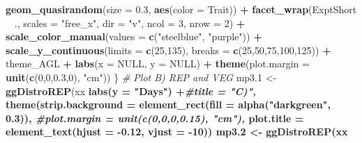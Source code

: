 \documentclass[
]{article}
\newenvironment{Shaded}{\begin{snugshade}}{\end{snugshade}}
\newcommand{\CommentTok}[1]{\textcolor[rgb]{0.56,0.35,0.01}{\textit{#1}}}
\newcommand{\DataTypeTok}[1]{\textcolor[rgb]{0.13,0.29,0.53}{#1}}
\newcommand{\DecValTok}[1]{\textcolor[rgb]{0.00,0.00,0.81}{#1}}
\newcommand{\FloatTok}[1]{\textcolor[rgb]{0.00,0.00,0.81}{#1}}
\newcommand{\KeywordTok}[1]{\textcolor[rgb]{0.13,0.29,0.53}{\textbf{#1}}}
\newcommand{\NormalTok}[1]{#1}
\newcommand{\OperatorTok}[1]{\textcolor[rgb]{0.81,0.36,0.00}{\textbf{#1}}}
\newcommand{\OtherTok}[1]{\textcolor[rgb]{0.56,0.35,0.01}{#1}}
\newcommand{\StringTok}[1]{\textcolor[rgb]{0.31,0.60,0.02}{#1}}
\begin{document}
\begin{Shaded}
\begin{Highlighting}[]
{{{{{{{{{{{{{{\StringTok{    }\KeywordTok{geom_quasirandom}\NormalTok{(}\DataTypeTok{size =} \FloatTok{0.3}\NormalTok{, }\KeywordTok{aes}\NormalTok{(}\DataTypeTok{color =}\NormalTok{ Trait)) }\OperatorTok{+}
\StringTok{    }\KeywordTok{facet_wrap}\NormalTok{(ExptShort }\OperatorTok{~}\StringTok{ }\NormalTok{., }\DataTypeTok{scales =} \StringTok{"free_x"}\NormalTok{, }\DataTypeTok{dir =} \StringTok{"v"}\NormalTok{, }\DataTypeTok{ncol =} \DecValTok{3}\NormalTok{, }\DataTypeTok{nrow =} \DecValTok{2}\NormalTok{) }\OperatorTok{+}
\StringTok{    }\KeywordTok{scale_color_manual}\NormalTok{(}\DataTypeTok{values =} \KeywordTok{c}\NormalTok{(}\StringTok{"steelblue"}\NormalTok{, }\StringTok{"purple"}\NormalTok{)) }\OperatorTok{+}
\StringTok{    }\KeywordTok{scale_y_continuous}\NormalTok{(}\DataTypeTok{limits =} \KeywordTok{c}\NormalTok{(}\DecValTok{25}\NormalTok{,}\DecValTok{135}\NormalTok{), }\DataTypeTok{breaks =} \KeywordTok{c}\NormalTok{(}\DecValTok{25}\NormalTok{,}\DecValTok{50}\NormalTok{,}\DecValTok{75}\NormalTok{,}\DecValTok{100}\NormalTok{,}\DecValTok{125}\NormalTok{)) }\OperatorTok{+}
\StringTok{    }\NormalTok{theme_AGL }\OperatorTok{+}\StringTok{ }\KeywordTok{labs}\NormalTok{(}\DataTypeTok{x =} \OtherTok{NULL}\NormalTok{, }\DataTypeTok{y =} \OtherTok{NULL}\NormalTok{) }\OperatorTok{+}\StringTok{ }
\StringTok{    }\KeywordTok{theme}\NormalTok{(}\DataTypeTok{plot.margin =} \KeywordTok{unit}\NormalTok{(}\KeywordTok{c}\NormalTok{(}\DecValTok{0}\NormalTok{,}\DecValTok{0}\NormalTok{,}\FloatTok{0.3}\NormalTok{,}\DecValTok{0}\NormalTok{), }\StringTok{"cm"}\NormalTok{))}
\NormalTok{\}}
\CommentTok{# Plot B) REP and VEG}
\NormalTok{mp3}\FloatTok{.1}\NormalTok{ <-}\StringTok{ }\KeywordTok{ggDistroREP}\NormalTok{(xx }\OperatorTok{%
\StringTok{  }\KeywordTok{labs}\NormalTok{(}\DataTypeTok{y =} \StringTok{"Days"}\NormalTok{) }\OperatorTok{+}\CommentTok{#title = "C)",}
\StringTok{  }\KeywordTok{theme}\NormalTok{(}\DataTypeTok{strip.background =} \KeywordTok{element_rect}\NormalTok{(}\DataTypeTok{fill =} \KeywordTok{alpha}\NormalTok{(}\StringTok{"darkgreen"}\NormalTok{, }\FloatTok{0.3}\NormalTok{)),}
        \CommentTok{#plot.margin = unit(c(0,0,0,0.15), "cm"),}
        \DataTypeTok{plot.title =} \KeywordTok{element_text}\NormalTok{(}\DataTypeTok{hjust =} \FloatTok{-0.12}\NormalTok{, }\DataTypeTok{vjust =} \DecValTok{-10}\NormalTok{))}
\NormalTok{mp3}\FloatTok{.2}\NormalTok{ <-}\StringTok{ }\KeywordTok{ggDistroREP}\NormalTok{(xx }\OperatorTok{%
}}}}}}}}}}}}}}}}
\end{Highlighting}
\end{Shaded}
\end{document}

